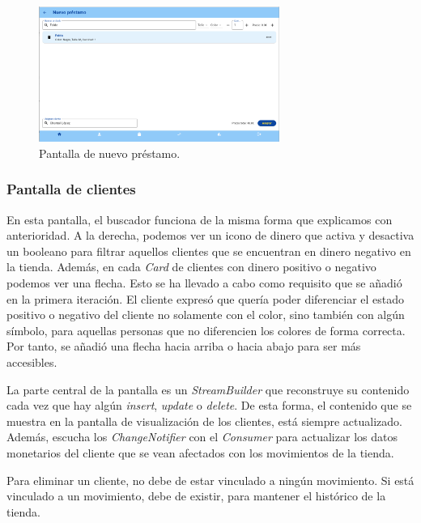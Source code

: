 \begin{figure}[H]
	\centering
	\includegraphics[width=0.7\textwidth]{imagenes/TerceraIteracion/nuevoPrestamo.png}
	\caption{Pantalla de nuevo préstamo.}
\end{figure}

\newpage

\subsubsection{Pantalla de clientes}

En esta pantalla, el buscador funciona de la misma forma que explicamos con anterioridad. A la derecha, podemos ver un icono de dinero que activa y desactiva un booleano para filtrar aquellos clientes que se encuentran en dinero negativo en la tienda. Además, en cada \textit{Card} de clientes con dinero positivo o negativo podemos ver una flecha. Esto se ha llevado a cabo como requisito que se añadió en la primera iteración. El cliente expresó que quería poder diferenciar el estado positivo o negativo del cliente no solamente con el color, sino también con algún símbolo, para aquellas personas que no diferencien los colores de forma correcta. Por tanto, se añadió una flecha hacia arriba o hacia abajo para ser más accesibles. 

La parte central de la pantalla es un \textit{StreamBuilder} que reconstruye su contenido cada vez que hay algún \textit{insert}, \textit{update} o \textit{delete}. De esta forma, el contenido que se muestra en la pantalla de visualización de los clientes, está siempre actualizado. Además, escucha los \textit{ChangeNotifier} con el \textit{Consumer} para actualizar los datos monetarios del cliente que se vean afectados con los movimientos de la tienda. 

Para eliminar un cliente, no debe de estar vinculado a ningún movimiento. Si está vinculado a un movimiento, debe de existir, para mantener el histórico de la tienda. 


